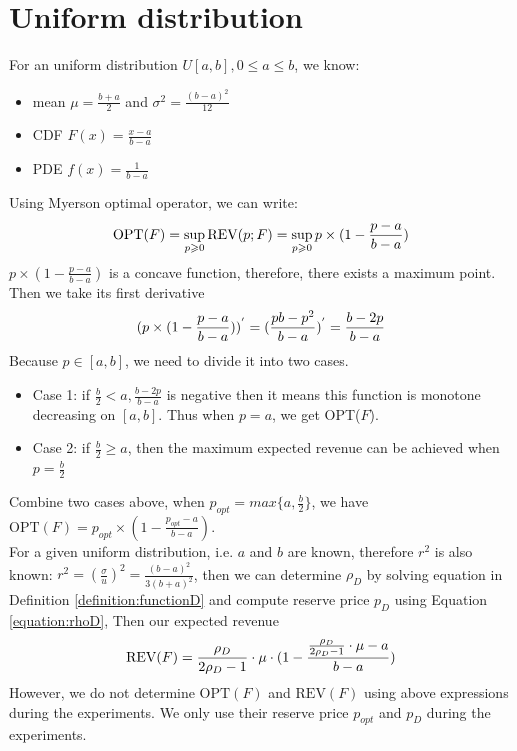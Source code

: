 \section{Uniform distribution}
For an uniform distribution $U[a,b], 0\leqslant a\leqslant b$, we know:
\begin{itemize}
	\item mean $\mu = \frac{b+a}{2}$ and $\sigma^{2} = \frac{(b-a)^{2}}{12}$
	\item CDF $F(x) = \frac {x-a}{b-a} $ 
	\item PDE $f(x) = \frac{1}{b-a}$
\end{itemize}
Using Myerson optimal operator, we can write:
\begin{equation}\notag
\text{OPT}(F) = \sup_{p \geqslant 0} \text{REV}(p;F) = \sup_{p \geqslant 0} p \times (1-\frac {p-a}{b-a}) 
\end{equation}
$p \times (1-\frac {p-a}{b-a})$ is a concave function, therefore, there exists a maximum point. Then we take its first derivative 
\begin{equation}\notag
	(p \times (1-\frac {p-a}{b-a}))^{'}  = (\frac {pb-p^2}{b-a})^{'} = \frac {b-2p}{b-a} 
\end{equation}
Because $p \in [a, b]$, we need to divide it into two cases.
\begin{itemize}
	\item Case 1: if $\frac{b}{2} < a, \frac {b-2p}{b-a}$ is negative then it means this function is monotone decreasing on $[a, b]$. Thus when $p = a$, we get OPT($F$). 
	\item Case 2: if $\frac{b}{2} \geqslant a $, then the maximum expected revenue can be achieved when $p = \frac{b}{2}$ 
\end{itemize}
Combine two cases above, when $p_{opt} =max \{a, \frac{b}{2} \}$, we have $\text{OPT}(F) =p_{opt} \times (1-\frac {p_{opt}-a}{b-a})$.\\
For a given uniform distribution, i.e. $a$ and $b$ are known, therefore $r^{2}$ is also known: $r^{2} = (\frac{\sigma}{u})^{2} = \frac{(b-a)^{2}}{3(b+a)^{2}}$, then we can determine $\rho_{D}$ by solving equation in Definition \ref{definition:functionD} and compute reserve price $p_D$ using Equation \ref{equation:rhoD}, Then our expected revenue
\begin{equation}\notag
	\text{REV} (F) = \frac{\rho_{D}}{2\rho_{D}-1}\cdot \mu \cdot (1-\frac{\frac{\rho_{D}}{2\rho_{D}-1}\cdot \mu -a}{b-a})
\end{equation}
However, we do not determine $\text{OPT}(F)$ and $\text{REV}(F)$ using above expressions during the experiments. We only use their reserve price $p_{opt}$ and $p_D$ during the experiments.


